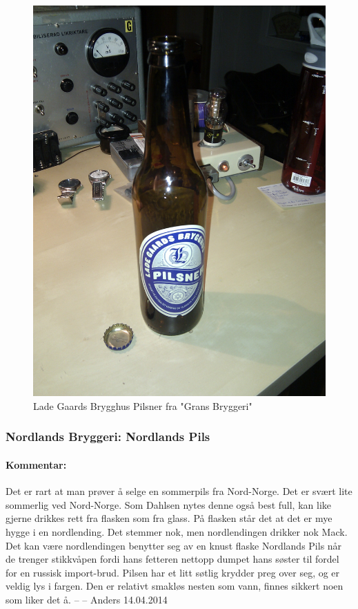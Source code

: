 \documentclass[12pt,a4paper,oneside,norsk]{article}
\begin{document}
\begin{figure} [H]
\centering
\includegraphics[scale=0.1, angle=0]{Bilder/Ol/ladeGaardPils.jpg}
\caption{Lade Gaards Brygghus Pilsner fra "Grans Bryggeri"}
\end{figure}

\newpage
\subsubsection{Nordlands Bryggeri: Nordlands Pils}
\paragraph{Kommentar:}Det er rart at man prøver å selge en sommerpils fra Nord-Norge. Det er svært lite sommerlig ved Nord-Norge. Som Dahlsen nytes denne også best full, kan like gjerne drikkes rett fra flasken som fra glass. På flasken står det at det er mye hygge i en nordlending. Det stemmer nok, men nordlendingen drikker nok Mack. Det kan være nordlendingen benytter seg av en knust flaske Nordlands Pils når de trenger stikkvåpen fordi hans fetteren nettopp dumpet hans søster til fordel for en russisk import-brud. Pilsen har et litt søtlig krydder preg over seg, og er veldig lys i fargen. Den er relativt smakløs nesten som vann, finnes sikkert noen som liker det å.
\newline
-- -- Anders 14.04.2014
\end{document}

